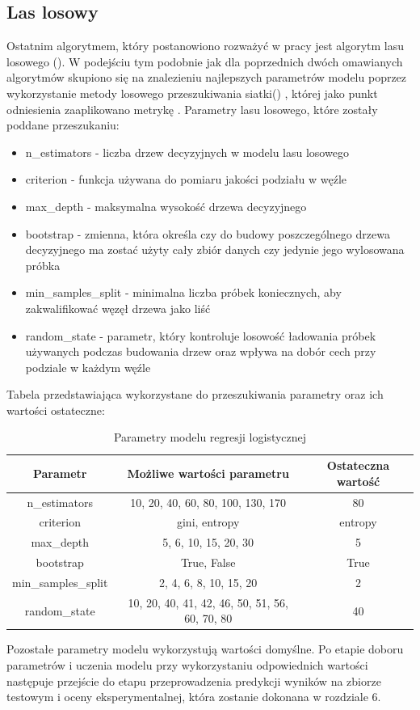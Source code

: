         \subsection{Las losowy}
        Ostatnim algorytmem, który postanowiono rozważyć w pracy jest algorytm lasu losowego (). W podejściu tym podobnie jak dla poprzednich dwóch omawianych algorytmów skupiono się na znalezieniu najlepszych parametrów modelu poprzez wykorzystanie metody losowego przeszukiwania siatki() \cite{SKcv}, której jako punkt odniesienia zaaplikowano metrykę  \cite{SKaccuracy}. Parametry lasu losowego, które zostały poddane przeszukaniu: \cite{SKRandomForest}
        \begin{itemize}
            \item n\_estimators - liczba drzew decyzyjnych w modelu lasu losowego
            \item criterion - funkcja używana do pomiaru jakości podziału w węźle
            \item max\_depth - maksymalna wysokość drzewa decyzyjnego
            \item bootstrap - zmienna, która określa czy do budowy poszczególnego drzewa decyzyjnego ma zostać użyty cały zbiór danych czy jedynie jego wylosowana próbka
            \item min\_samples\_split - minimalna liczba próbek koniecznych, aby zakwalifikować węzęł drzewa jako liść
            \item random\_state - parametr, który kontroluje losowość ładowania próbek używanych podczas budowania drzew oraz wpływa na dobór cech przy podziale w każdym węźle
        \end{itemize}
        Tabela przedstawiająca wykorzystane do przeszukiwania parametry oraz ich wartości ostateczne:
        \begin{table}[H]
        \caption{Parametry modelu regresji logistycznej}
        \label{tab:params_lr}
        \centering
        \begin{tabular}{c c c}
        \toprule
            Parametr & Możliwe wartości parametru & Ostateczna wartość \\
        \midrule
            n\_estimators & 10, 20, 40, 60, 80, 100, 130, 170 & 80 \\
            criterion & gini, entropy & entropy \\
            max\_depth & 5, 6, 10, 15, 20, 30 & 5 \\
            bootstrap & True, False & True \\
            min\_samples\_split & 2, 4, 6, 8, 10, 15, 20 & 2\\
            random\_state & 10, 20, 40, 41, 42, 46, 50, 51, 56, 60, 70, 80 & 40 \\
        \bottomrule
        \end{tabular}
        \end{table}
        Pozostałe parametry modelu wykorzystują wartości domyślne. Po etapie doboru parametrów i uczenia modelu przy wykorzystaniu odpowiednich wartości następuje przejście do etapu przeprowadzenia predykcji wyników na zbiorze testowym i oceny eksperymentalnej, która zostanie dokonana w rozdziale 6.